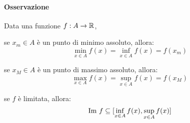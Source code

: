 \paragraph{Osservazione}
Data una funzione $f:A\rightarrow\mathbb{R}$,
\begin{aenumerate}
\item se $x_m\in A$ è un punto di minimo assoluto, allora:
\[\min_{x\in A}{f(x)}=\inf_{x\in A}{f(x)}=f(x_m)\]
\item se $x_M\in A$ è un punto di massimo assoluto, allora:
\[\max_{x\in A}{f(x)}=\sup_{x\in A}{f(x)}=f(x_M)\]
\item se $f$ è limitata, allora:
\[\text{Im } f \subseteq [\inf_{x\in A}{f(x)}, \sup_{x\in A}{f(x)}] \]
\end{aenumerate}